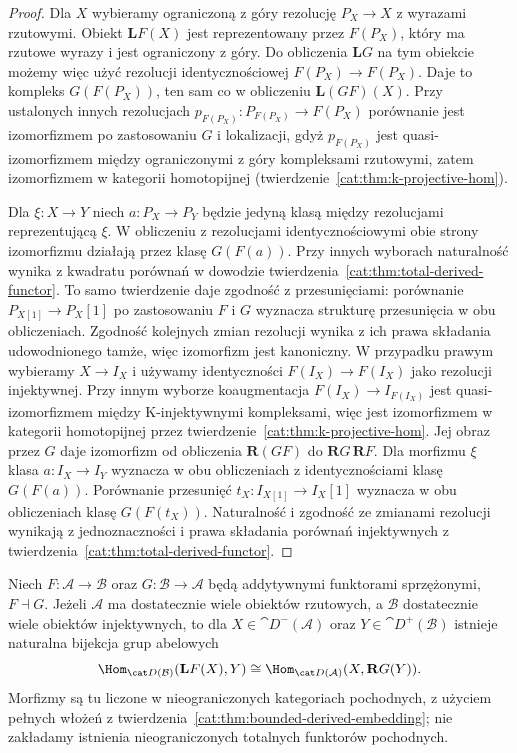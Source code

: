 \begin{proof}
Dla $X$ wybieramy ograniczoną z góry rezolucję $P_X\to X$ z wyrazami rzutowymi. Obiekt $\mathbf L F(X)$ jest reprezentowany przez $F(P_X)$, który ma rzutowe wyrazy i jest ograniczony z góry. Do obliczenia $\mathbf L G$ na tym obiekcie możemy więc użyć rezolucji identycznościowej $F(P_X)\to F(P_X)$. Daje to kompleks $G(F(P_X))$, ten sam co w obliczeniu $\mathbf L(GF)(X)$. Przy ustalonych innych rezolucjach $p_{F(P_X)}:P_{F(P_X)}\to F(P_X)$ porównanie jest izomorfizmem po zastosowaniu $G$ i lokalizacji, gdyż $p_{F(P_X)}$ jest quasi-izomorfizmem między ograniczonymi z góry kompleksami rzutowymi, zatem izomorfizmem w kategorii homotopijnej (twierdzenie~\ref{cat:thm:k-projective-hom}).

Dla $\xi:X\to Y$ niech $a:P_X\to P_Y$ będzie jedyną klasą między rezolucjami reprezentującą $\xi$. W obliczeniu z rezolucjami identycznościowymi obie strony izomorfizmu działają przez klasę $G(F(a))$. Przy innych wyborach naturalność wynika z kwadratu porównań w dowodzie twierdzenia~\ref{cat:thm:total-derived-functor}. To samo twierdzenie daje zgodność z przesunięciami: porównanie $P_{X[1]}\to P_X[1]$ po zastosowaniu $F$ i $G$ wyznacza strukturę przesunięcia w obu obliczeniach. Zgodność kolejnych zmian rezolucji wynika z ich prawa składania udowodnionego tamże, więc izomorfizm jest kanoniczny. W przypadku prawym wybieramy $X\to I_X$ i używamy identyczności $F(I_X)\to F(I_X)$ jako rezolucji injektywnej. Przy innym wyborze koaugmentacja $F(I_X)\to I_{F(I_X)}$ jest quasi-izomorfizmem między K-injektywnymi kompleksami, więc jest izomorfizmem w kategorii homotopijnej przez twierdzenie~\ref{cat:thm:k-projective-hom}. Jej obraz przez $G$ daje izomorfizm od obliczenia $\mathbf R(GF)$ do $\mathbf R G\,\mathbf R F$. Dla morfizmu $\xi$ klasa $a:I_X\to I_Y$ wyznacza w obu obliczeniach z identycznościami klasę $G(F(a))$. Porównanie przesunięć $t_X:I_{X[1]}\to I_X[1]$ wyznacza w obu obliczeniach klasę $G(F(t_X))$. Naturalność i zgodność ze zmianami rezolucji wynikają z jednoznaczności i prawa składania porównań injektywnych z twierdzenia~\ref{cat:thm:total-derived-functor}.
\end{proof}
\begin{twierdzenie}\label{cat:thm:derived-adjunction}
Niech $F:\mathcal A\to\mathcal B$ oraz $G:\mathcal B\to\mathcal A$ będą addytywnymi funktorami sprzężonymi, $F\dashv G$. Jeżeli $\mathcal A$ ma dostatecznie wiele obiektów rzutowych, a $\mathcal B$ dostatecznie wiele obiektów injektywnych, to dla $X\in\cat D^-(\mathcal A)$ oraz $Y\in\cat D^+(\mathcal B)$ istnieje naturalna bijekcja grup abelowych
\[
 \Hom_{\cat D(\mathcal B)}(\mathbf L F(X),Y)
 \cong
 \Hom_{\cat D(\mathcal A)}(X,\mathbf R G(Y)).
\]
Morfizmy są tu liczone w nieograniczonych kategoriach pochodnych, z użyciem pełnych włożeń z twierdzenia~\ref{cat:thm:bounded-derived-embedding}; nie zakładamy istnienia nieograniczonych totalnych funktorów pochodnych.
\end{twierdzenie}
